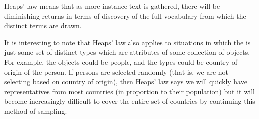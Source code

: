     Heaps' law means that as more instance text is gathered, there will be diminishing returns in terms of discovery of the full vocabulary from which the distinct terms are drawn.

    It is interesting to note that Heaps' law also applies to situations in which the  is just some set of distinct types which are attributes of some collection of objects. For example, the objects could be people, and the types could be country of origin of the person. If persons are selected randomly (that is, we are not selecting based on country of origin), then Heaps' law says we will quickly have representatives from most countries (in proportion to their population) but it will become increasingly difficult to cover the entire set of countries by continuing this method of sampling.